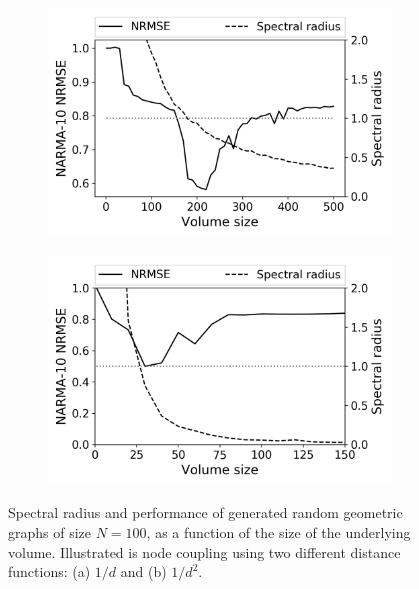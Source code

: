 \begin{figure}[t!]
  \centering
  \begin{subfigure}{.49\textwidth}
    \centering
    \includegraphics[width=1.0\linewidth]{figures/RGG-volume-size-inv.png}
    \caption{}
    \label{fig:size-graph-volume-b}
  \end{subfigure}
  \begin{subfigure}{.49\textwidth}
    \centering
    \includegraphics[width=1.0\linewidth]{figures/RGG-volume-size-inv-squared.png}
    \caption{}
    \label{fig:size-graph-volume-b}
  \end{subfigure}
  \caption{
    Spectral radius and performance of generated random geometric graphs of size
$N = 100$, as a function of the size of the underlying volume. Illustrated is
node coupling using two different distance functions: (a) $1/d$ and (b) $1/d^2$.
  }
  \label{fig:size-graph-volume}
\end{figure}

